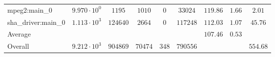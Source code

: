 \begin{tabular}{|l|c|c|c|c|c|c|c|c|}
mpeg2:main\_0           & $ 9.970 \cdot 10^{0} $ & $ 1195   $ & $ 1010  $ & $ 0   $ & $ 33024  $ & $ 119.86      $ & $ 1.66    $ & $ 2.01    $ \\
sha\_driver:main\_0     & $ 1.113 \cdot 10^{3} $ & $ 124640 $ & $ 2664  $ & $ 0   $ & $ 117248 $ & $ 112.03      $ & $ 1.07    $ & $ 45.76   $ \\
\hline
Average                 & $                    $ & $        $ & $       $ & $     $ & $        $ & $ 107.46      $ & $ 0.53    $ & $         $ \\
\hline
Overall                 & $ 9.212 \cdot 10^{3} $ & $ 904869 $ & $ 70474 $ & $ 348 $ & $ 790556 $ & $             $ & $         $ & $ 554.68  $ \\
\hline
\end{tabular}
